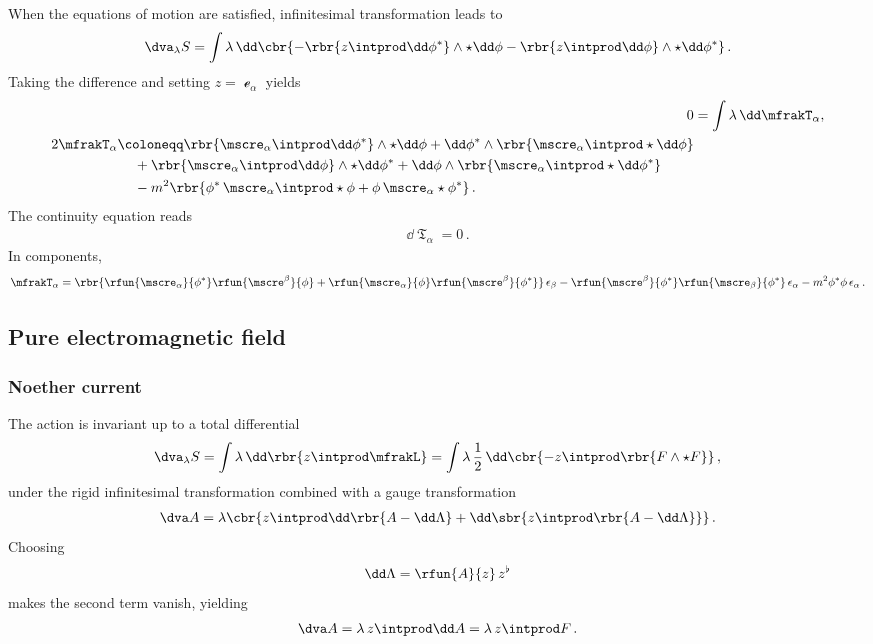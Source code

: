 \documentclass[a4paper]{article}
\begin{document}
When the equations of motion are satisfied, infinitesimal 
transformation leads to
\begin{align}
\dva_{\lambda} S = \int \lambda\,\dd\cbr{
	-\rbr{z\intprod\dd\phi^*}\wedge\star\dd\phi
	-\rbr{z\intprod\dd\phi}\wedge\star\dd\phi^*}\,.
\end{align}
Taking the difference and setting $z = \mscre_{\alpha}$ yields
\begin{align}
0 &= \int \lambda\,\dd \mfrakT_{\alpha}, \\
\begin{split}
2 \mfrakT_{\alpha} &\coloneqq
\rbr{\mscre_{\alpha}\intprod\dd\phi^*}\wedge\star\dd\phi +
\dd\phi^*\wedge\rbr{\mscre_{\alpha}\intprod\star\dd\phi}
\\
&\quad\,+
\rbr{\mscre_{\alpha}\intprod\dd\phi}\wedge\star\dd\phi^* +
\dd\phi\wedge\rbr{\mscre_{\alpha}\intprod\star\dd\phi^*}
\\
&\quad\,-
m^2\rbr{\phi^*\,\mscre_{\alpha}\intprod\star\phi +
	\phi\,\mscre_{\alpha}\star\phi^*}\,.
\end{split}
\end{align}
The continuity equation reads
\begin{align}
\dd \mfrakT_{\alpha} = 0\,.
\end{align}
In components,
\begin{align}
\mfrakT_{\alpha} =
\rbr{\rfun{\mscre_{\alpha}}{\phi^*} \rfun{\mscre^{\beta}}{\phi}+
	\rfun{\mscre_{\alpha}}{\phi} \rfun{\mscre^{\beta}}{\phi^*}}\,
		\epsilon_{\beta} - 
\rfun{\mscre^{\beta}}{\phi^*} \rfun{\mscre_{\beta}}{\phi^*}\,
	\epsilon_{\alpha}
- m^2 \phi^* \phi\, \epsilon_{\alpha}\,.
\end{align}

\subsection{Pure electromagnetic field}

\subsubsection{Noether current}
The action is invariant up to a total differential
\begin{align}
\dva_{\lambda} S = \int \lambda\,\dd\rbr{z \intprod \mfrakL}
= \int \lambda\,\frac{1}{2}\,\dd\cbr{
	- z\intprod \rbr{F\wedge\star F} }\,,
\end{align}
under the rigid infinitesimal transformation combined with a gauge 
transformation \cite[eq.\ 3.46]{Scheck2017}
\begin{align}
\dva A = \lambda\cbr{z\intprod \dd \rbr{A-\dd\Lambda} + 
	\dd\sbr{z\intprod\rbr{A-\dd\Lambda}}}\,.
\end{align}
Choosing
\begin{align}
\dd\Lambda = \rfun{A}{z}\,z^{\flat}
\end{align}
makes the second term vanish, yielding
\begin{align}
\dva A = \lambda\,z\intprod \dd A = \lambda\,z\intprod F \,.
\end{align}
\end{document}
